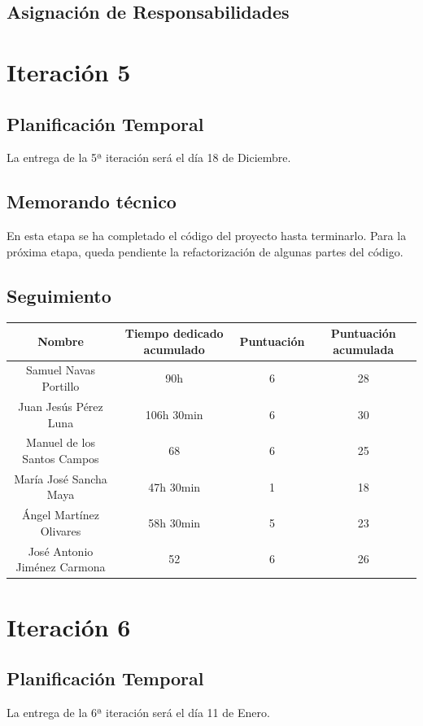 \documentclass[11 pt]{book}
\begin{document}
	\section{Asignación de Responsabilidades}
		

\chapter{Iteración 5}
	\section{Planificación Temporal}
		La entrega de la 5ª iteración será el día 18 de Diciembre.
	
	\section{Memorando técnico}
		En esta etapa se ha completado el código del proyecto hasta terminarlo. Para la próxima etapa, queda pendiente la refactorización de algunas partes del código.
		
	\section{Seguimiento}
		\begin{tabular}{|c|c|c|c|}
			\hline
			Nombre & Tiempo dedicado acumulado & Puntuación & Puntuación acumulada\\
			\hline
			Samuel Navas Portillo & 90h & 6 & 28\\
			Juan Jesús Pérez Luna & 106h 30min & 6 & 30\\
			Manuel de los Santos Campos & 68 & 6 & 25\\
			María José Sancha Maya & 47h 30min & 1 & 18\\
			Ángel Martínez Olivares & 58h 30min & 5 & 23\\
			José Antonio Jiménez Carmona & 52 & 6 & 26\\
			\hline
		\end{tabular}
	
\chapter{Iteración 6}
	\section{Planificación Temporal}
		La entrega de la 6ª iteración será el día 11 de Enero.
\end{document}
